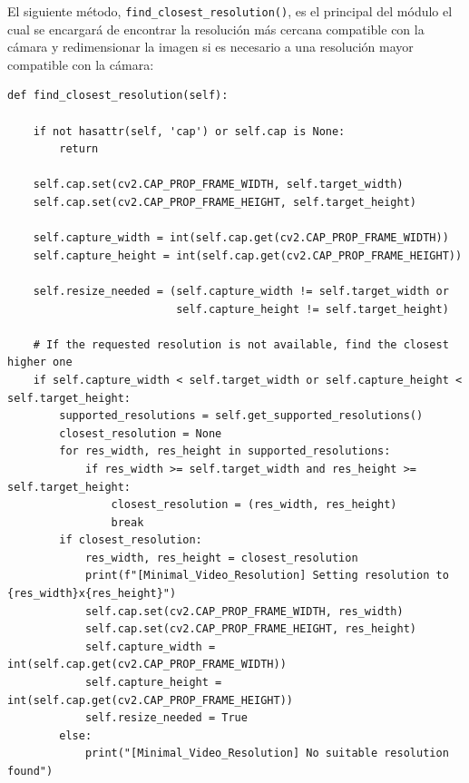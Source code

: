 El siguiente método, \texttt{find\_closest\_resolution()}, es el principal del módulo el cual se encargará de encontrar la resolución más cercana compatible con la cámara y redimensionar la imagen si es necesario a una resolución mayor compatible con la cámara:
\begin{lstlisting}[style=pythonstyle, caption={Método \texttt{find\_closest\_resolution()} de \textit{Minimal\_Video\_Resolution}.}, label={lst:find_closest_resolution_minimal_video_resolution}]
def find_closest_resolution(self):
    
    if not hasattr(self, 'cap') or self.cap is None:
        return

    self.cap.set(cv2.CAP_PROP_FRAME_WIDTH, self.target_width)
    self.cap.set(cv2.CAP_PROP_FRAME_HEIGHT, self.target_height)

    self.capture_width = int(self.cap.get(cv2.CAP_PROP_FRAME_WIDTH))
    self.capture_height = int(self.cap.get(cv2.CAP_PROP_FRAME_HEIGHT))

    self.resize_needed = (self.capture_width != self.target_width or 
                          self.capture_height != self.target_height)

    # If the requested resolution is not available, find the closest higher one
    if self.capture_width < self.target_width or self.capture_height < self.target_height:
        supported_resolutions = self.get_supported_resolutions()
        closest_resolution = None
        for res_width, res_height in supported_resolutions:
            if res_width >= self.target_width and res_height >= self.target_height:
                closest_resolution = (res_width, res_height)
                break
        if closest_resolution:
            res_width, res_height = closest_resolution
            print(f"[Minimal_Video_Resolution] Setting resolution to {res_width}x{res_height}")
            self.cap.set(cv2.CAP_PROP_FRAME_WIDTH, res_width)
            self.cap.set(cv2.CAP_PROP_FRAME_HEIGHT, res_height)
            self.capture_width = int(self.cap.get(cv2.CAP_PROP_FRAME_WIDTH))
            self.capture_height = int(self.cap.get(cv2.CAP_PROP_FRAME_HEIGHT))
            self.resize_needed = True
        else:
            print("[Minimal_Video_Resolution] No suitable resolution found")
\end{lstlisting}
\vspace{\baselineskip}

